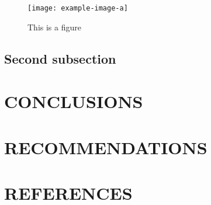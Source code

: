 \documentclass[titlepage, 12pt]{article}
\let\oldsection\section
\renewcommand\section[1]{\oldsection{\MakeUppercase{#1}}}
\begin{document}
\begin{figure}[ht!]
    \centering
    \texttt{[image: example-image-a]}
    \caption{This is a figure}
    \label{fig:firstfig}
\end{figure}

\subsection{Second subsection}

\lipsum

\section{Conclusions}

\lipsum

\section{Recommendations}

\lipsum

\newpage
\setcounter{secnumdepth}{0}  %
\section{References}

\printbibliography[heading=none]
\end{document}
